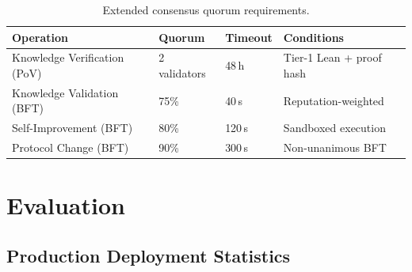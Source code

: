 \documentclass[11pt,a4paper]{article}
\theoremstyle{plain}
\theoremstyle{definition}
\theoremstyle{remark}
\begin{document}
\begin{table}[ht]
\centering
\caption{Extended consensus quorum requirements.}
\label{tab:quorum}
\begin{tabular}{@{}lllp{5cm}@{}}
\toprule
\textbf{Operation} & \textbf{Quorum} & \textbf{Timeout} & \textbf{Conditions} \\
\midrule
Knowledge Verification (PoV) & 2 validators & 48\,h   & Tier-1 Lean + proof hash \\
Knowledge Validation (BFT)   & 75\%         & 40\,s   & Reputation-weighted \\
Self-Improvement (BFT)       & 80\%         & 120\,s  & Sandboxed execution \\
Protocol Change (BFT)        & 90\%         & 300\,s  & Non-unanimous BFT \\
\bottomrule
\end{tabular}
\end{table}

\section{Evaluation}
\label{sec:evaluation}

\subsection{Production Deployment Statistics}
\end{document}
